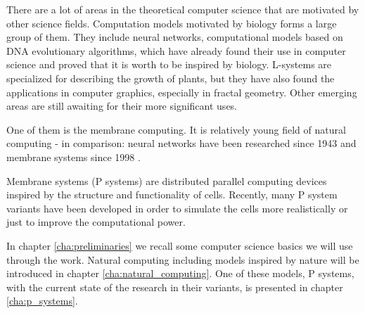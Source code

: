
There are a lot of areas in the theoretical computer science that are motivated by other science fields. Computation models motivated by biology forms a large group of them. They include neural networks, computational models based on DNA evolutionary algorithms, which have already found their use in computer science and proved that it is worth to be inspired by biology. L-systems are specialized for describing the growth of plants, but they have also found the applications in computer graphics, especially in fractal geometry. Other emerging areas are still awaiting for their more significant uses.

One of them is the membrane computing. It is relatively young field of natural computing - in comparison: neural networks have been researched since 1943 and membrane systems since 1998 \cite{Paun98}.

Membrane systems (P systems) are distributed parallel computing devices inspired by the structure and functionality of cells. Recently, many P system variants have been developed in order to simulate the cells more realistically or just to improve the computational power.

In chapter \ref{cha:preliminaries} we recall some computer science basics we will use through the work.
Natural computing including models inspired by nature will be introduced in chapter \ref{cha:natural_computing}. One of these models, P systems, with the current state of the research in their variants, is presented in chapter \ref{cha:p_systems}.
